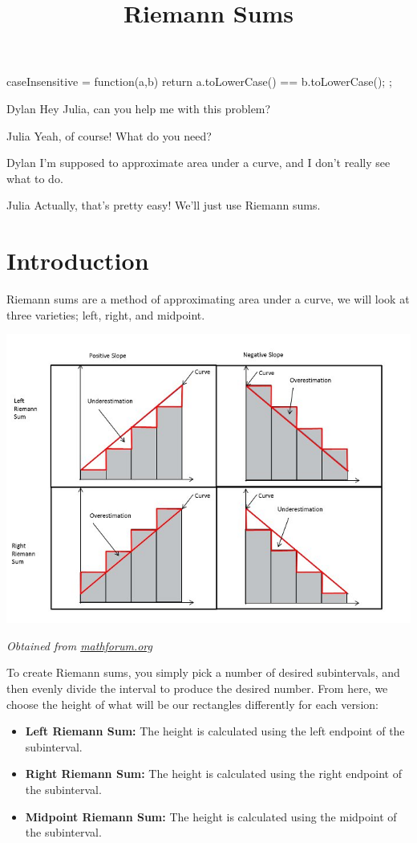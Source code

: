 \documentclass{ximera}
\title{Riemann Sums}
\begin{document}
\maketitle
\begin{javascript}
 caseInsensitive = function(a,b) {
    return a.toLowerCase() == b.toLowerCase();
  };
\end{javascript}
\begin{dialogue}
\item[Dylan] Hey Julia, can you help me with this problem?
\item[Julia] Yeah, of course! What do you need?
\item[Dylan] I'm supposed to approximate area under a curve, and I don't really see what to do.
\item[Julia] Actually, that's pretty easy! We'll just use Riemann sums.
\end{dialogue}

\section{Introduction}
Riemann sums are a method of approximating area under a curve, we will look at three varieties; left, right, and midpoint.

\begin{image}
\includegraphics{Table}
\end{image}
\begin{center}
\textit{Obtained from \href{http://mathforum.org/mathimages/index.php/Riemann_Sums}{mathforum.org}}
\end{center}


To create Riemann sums, you simply pick a number of desired subintervals, and then evenly divide the interval to produce the desired number. From here, we choose the height of what will be our rectangles differently for each version:
\begin{itemize}
\item{\textbf{Left Riemann Sum:} The height is calculated using the left endpoint of the subinterval.}
\item{\textbf{Right Riemann Sum:} The height is calculated using the right endpoint of the subinterval.}
\item{\textbf{Midpoint Riemann Sum:} The height is calculated using the midpoint of the subinterval.}
\end{itemize}
\end{document}
